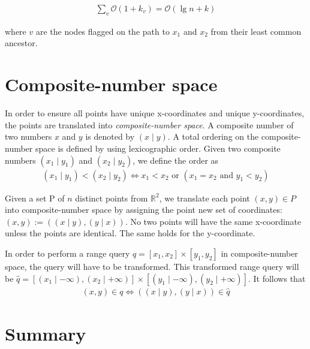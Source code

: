 \begin{align*}
  \sum\limits_{v} \mathcal{O}(1 + k_v) = \mathcal{O}(\lg n + k)
\end{align*}

\noindent where $v$ are the nodes flagged on the path to $x_1$ and $x_2$ from their least common ancestor.

\section{Composite-number space} 
\label{sect:composite}
In order to ensure all points have unique x-coordinates and unique y-coordinates, the points are translated into \emph{composite-number space}. A composite number of two numbers $x$ and $y$ is denoted by $(x \mid y)$. A total ordering on the composite-number space is defined by using lexicographic order. Given two composite numbers $(x_1 \mid y_1)$ and $(x_2 \mid y_2)$, we define the order as
\begin{align*}
  (x_1 \mid y_1) < (x_2 \mid y_2) \iff x_1 < x_2 \text{ or } (x_1 = x_2 \text{ and } y_1 < y_2)
\end{align*}

\noindent Given a set P of $n$ distinct points from $\mathbb{R}^2$, we translate each point $(x,y) \in P$ into composite-number space by assigning the point new set of coordinates: $(x,y) := ( (x \mid y), (y \mid x) )$. No two points will have the same x-coordinate unless the points are identical. The same holds for the y-coordinate.

\noindent In order to perform a range query $q = [x_1, x_2] \times [y_1, y_2]$ in composite-number space, the query will have to be transformed. This transformed range query will be $\hat{q} = [(x_1 \mid -\infty), (x_2 \mid +\infty)] \times [(y_1 \mid -\infty), (y_2 \mid +\infty)]$. It follows that 
\begin{align*}
  (x,y) \in q \iff ( (x \mid y), (y \mid x) ) \in \hat{q}
\end{align*}


\section{Summary}
\label{sect:relsummary}

